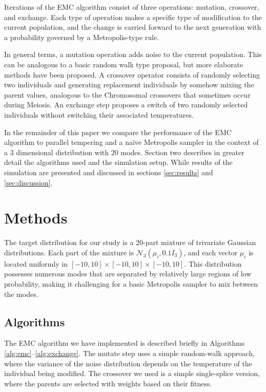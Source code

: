 \documentclass[12pt]{article}\usepackage[]{graphicx}\usepackage[]{color}
\begin{document}
Iterations of the EMC algorithm consist of three operations: mutation,
crossover, and exchange. Each type of operation makes a specific type
of modification to the current population, and the change is carried
forward to the next generation with a probability governed by a
Metropolis-type rule.

In general terms, a mutation operation adds noise to the current
population. This can be analogous to a basic random walk type
proposal, but more elaborate methods have been
proposed. A crossover operator consists of
randomly selecting two individuals and generating replacement
individuals by somehow mixing the parent values, analogous to the
Chromosomal crossovers that sometimes occur during Meiosis.  An
exchange step proposes a switch of two randomly selected individuals
without switching their associated temperatures.


In the remainder of this paper we compare the performance of the EMC
algorithm to parallel tempering and a na\"ive Metropolis sampler in
the context of a 3 dimensional distribution with 20 modes.  Section
two describes in greater detail the algorithms used and the simulation
setup.  While results of the simulation are presented and discussed in
sections \ref{sec:results} and \ref{sec:discussion}.

\setcounter{section}{1}
\section{Methods}
\label{sec:methods}
The target distribution for our study is a 20-part mixture of
trivariate Gaussian distributions. Each part of the mixture is
$\mathcal{N}_3(\mu_i, 0.1I_3)$, and each vector $\mu_i$ is located
uniformly in $[-10,10]\times[-10,10]\times[-10,10].$ This distribution
possesses numerous modes that are separated by relatively large
regions of low probability, making it challenging for a basic
Metropolis sampler to mix between the modes.

\subsection{Algorithms}
\label{sec:algorithms}

The EMC algorithm we have implemented is described briefly in
Algorithms \ref{alg:emc}--\ref{alg:exchange}.  The mutate step uses a
simple random-walk approach, where the variance of the noise
distribution depends on the temperature of the individual being
modified.  The crossover we used is a simple single-splice version, where
the parents are selected with weights based on their fitness.
\end{document}
